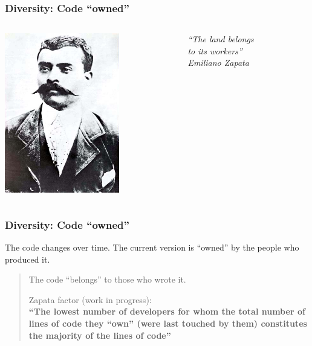 \documentclass[17pt,aspectratio=169,hyperref=pdfusetitle]{beamer}
\begin{document}
\begin{frame}
\frametitle{Diversity: Code ``owned''}

\begin{columns}[T]
\begin{column}{.48\textwidth}
  \includegraphics[width=5cm]{figs/emiliano_zapata}
  
\end{column}%
\hfill%
\begin{column}{.50\textwidth}
  {\Large \em ``The land belongs \\
    to its workers'' \\
    \vspace{.4cm}
    Emiliano Zapata \\
  }
\end{column}%
\end{columns}

\end{frame}

\begin{frame}
\frametitle{Diversity: Code ``owned''}

{\Large
  The code changes over time. The current version is ``owned'' by the people who produced it.\\

  \begin{quote}
    The code ``belongs'' to those who wrote it.

  \vspace{.5cm}
  Zapata factor (work in progress): \\
  {\bf ``The lowest number of developers for whom the total number of lines of code they ``own'' (were last touched by them) constitutes the majority of the lines of code''} \\
  \end{quote}
}
\end{frame}
\end{document}
